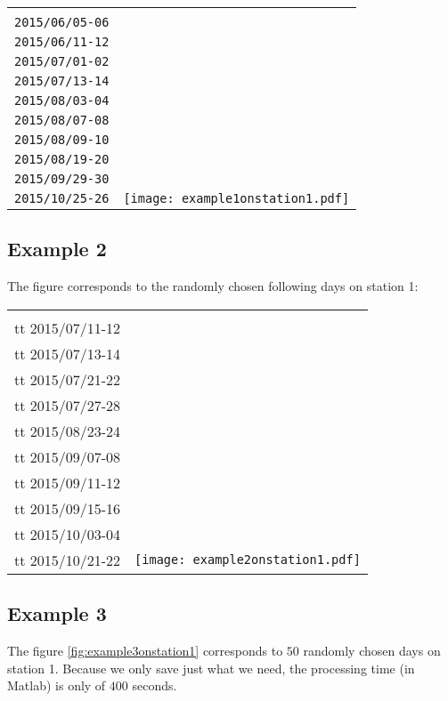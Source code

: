 \documentclass[a4paper, 12pt]{report}
\begin{document}
\begin{tabular}{cc}
 \begin{minipage}{0.35\textwidth}
 days:\\
 {\tt   2015/06/05-06}\\
 {\tt   2015/06/11-12}  \\
 {\tt   2015/07/01-02}  \\
 {\tt   2015/07/13-14}  \\
 {\tt   2015/08/03-04}  \\
 {\tt   2015/08/07-08}  \\
 {\tt   2015/08/09-10}  \\
 {\tt   2015/08/19-20}  \\
 {\tt   2015/09/29-30}  \\
 {\tt   2015/10/25-26}  
\end{minipage}
&
 \begin{minipage}{0.35\textwidth}
\texttt{[image: example1onstation1.pdf]}
\end{minipage}
\end{tabular}
 
 
\subsection{Example 2}
The figure corresponds to the randomly chosen following days on station 1:
\begin{tabular}{cc}
 \begin{minipage}{0.35\textwidth}
 days:\\
 {tt 2015/07/11-12 }\\
{tt 2015/07/13-14 }\\
{tt 2015/07/21-22 }\\
{tt 2015/07/27-28 }\\
{tt 2015/08/23-24 }\\
{tt 2015/09/07-08 }\\
{tt 2015/09/11-12 }\\
{tt 2015/09/15-16 }\\
{tt 2015/10/03-04 }\\
{tt 2015/10/21-22 }
\end{minipage}
&
 \begin{minipage}{0.35\textwidth}
\texttt{[image: example2onstation1.pdf]}
\end{minipage}
\end{tabular}

\subsection{Example 3}
 The figure \ref{fig:example3onstation1} corresponds to $50$ randomly chosen days on station 1.  Because we  only save just what we need, the processing time (in Matlab) is only of $400$ seconds.
\end{document}
